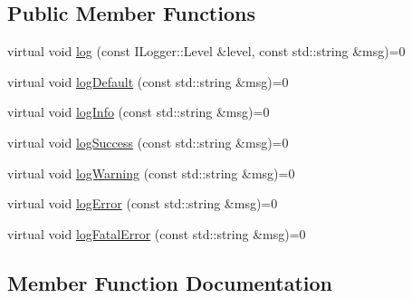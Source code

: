 \subsection*{Public Member Functions}
\begin{DoxyCompactItemize}
\item 
virtual void \hyperlink{classnexusZiaApi_1_1ILogger_a3fdab5380f82bfac1a68d58ae8a3f23d}{log} (const I\+Logger\+::\+Level \&level, const std\+::string \&msg)=0
\item 
virtual void \hyperlink{classnexusZiaApi_1_1ILogger_ae2fe20e82d85ab89f9f67135562c1427}{log\+Default} (const std\+::string \&msg)=0
\item 
virtual void \hyperlink{classnexusZiaApi_1_1ILogger_a3b8b8623cb92ecbe28a6e00e06a2d97d}{log\+Info} (const std\+::string \&msg)=0
\item 
virtual void \hyperlink{classnexusZiaApi_1_1ILogger_a17a3b1b8faadd679b9c15a349a7d8f57}{log\+Success} (const std\+::string \&msg)=0
\item 
virtual void \hyperlink{classnexusZiaApi_1_1ILogger_a162eb72b21133757007f19cca1882ad5}{log\+Warning} (const std\+::string \&msg)=0
\item 
virtual void \hyperlink{classnexusZiaApi_1_1ILogger_aec0efeb8d10df1c6b9caf280da82f183}{log\+Error} (const std\+::string \&msg)=0
\item 
virtual void \hyperlink{classnexusZiaApi_1_1ILogger_aee10afb1b3bd38434086ebdaf5f98ae8}{log\+Fatal\+Error} (const std\+::string \&msg)=0
\end{DoxyCompactItemize}


\subsection{Member Function Documentation}
